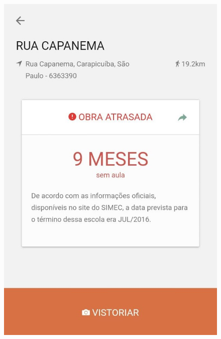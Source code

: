 \documentclass[12pt,a4paper,]{article}
\begin{document}
\begin{figure}
\begin{minipage}[t]{.3\textwidth}
       \includegraphics[scale=0.25]{tdp01.jpg}
     \end{minipage}
     \hfill
     \begin{minipage}[t]{.3\textwidth}
       \centering

\end{minipage}
\end{figure}
\end{document}
